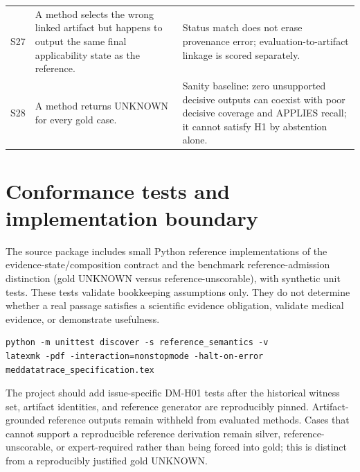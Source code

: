 \documentclass[11pt,a4paper]{article}
\begin{document}
\begin{longtable}{@{}L{13mm}L{75mm}L{63mm}@{}}
S27 & A method selects the wrong linked artifact but happens to output the same final applicability state as the reference. & Status match does not erase provenance error; evaluation-to-artifact linkage is scored separately.\\
S28 & A method returns UNKNOWN for every gold case. & Sanity baseline: zero unsupported decisive outputs can coexist with poor decisive coverage and APPLIES recall; it cannot satisfy H1 by abstention alone.\\
\bottomrule
\end{longtable}

\section{Conformance tests and implementation boundary}
The source package includes small Python reference implementations of the evidence-state/composition contract and the benchmark reference-admission distinction (gold UNKNOWN versus reference-unscorable), with synthetic unit tests. These tests validate bookkeeping assumptions only. They do not determine whether a real passage satisfies a scientific evidence obligation, validate medical evidence, or demonstrate usefulness.

\begin{lstlisting}
python -m unittest discover -s reference_semantics -v
latexmk -pdf -interaction=nonstopmode -halt-on-error meddatatrace_specification.tex
\end{lstlisting}

The project should add issue-specific DM-H01 tests after the historical witness set, artifact identities, and reference generator are reproducibly pinned. Artifact-grounded reference outputs remain withheld from evaluated methods. Cases that cannot support a reproducible reference derivation remain silver, reference-unscorable, or expert-required rather than being forced into gold; this is distinct from a reproducibly justified gold UNKNOWN.

\clearpage
\printbibliography[heading=bibintoc,title={References}]
\end{document}
